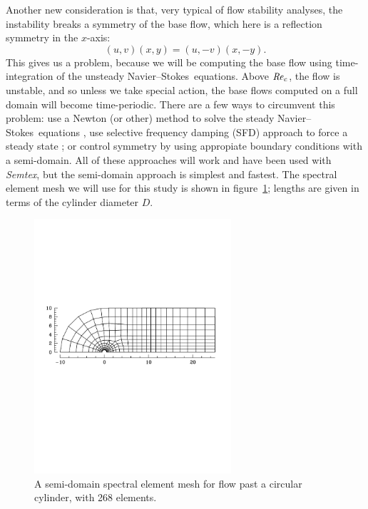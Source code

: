\documentclass[11pt,a4paper]{report}
\newcommand\Rey{\mbox{\textit{Re}}}
\newcommand\NavSto{Navier--Stokes}
\newcommand{\Semtex}{\emph{Semtex}}
\begin{document}
Another new consideration is that, very typical of flow stability
analyses, the instability breaks a symmetry of the base flow, which
here is a reflection symmetry in the $x$-axis:
\begin{equation}
(u,v)(x,y)=(u,-v)(x,-y).
\end{equation}
This gives us a problem, because we will be computing the base flow
using time-integration of the unsteady \NavSto\ equations.  Above
$\Rey_c$, the flow is unstable, and so unless we take special action,
the base flows computed on a full domain will become time-periodic.
There are a few ways to circumvent this problem: use a Newton (or
other) method to solve the steady \NavSto\ equations
\citep{tuba00,hmb02a}, use selective frequency damping (SFD) approach
to force a steady state \citep{abhhms06}; or control symmetry by using
appropiate boundary conditions with a semi-domain.  All of these
approaches will work and have been used with \Semtex, but the
semi-domain approach is simplest and fastest.  The spectral element
mesh we will use for this study is shown in
figure~\ref{fig.semicylmesh}; lengths are given in terms of the
cylinder diameter $D$.

\begin{figure}
\begin{center}
\includegraphics[width=0.65\textwidth]{semicyl02mesh.pdf}
\end{center}
\caption{A semi-domain spectral element mesh for flow past a circular
  cylinder, with 268 elements.}
\label{fig.semicylmesh}
\end{figure}
\end{document}
